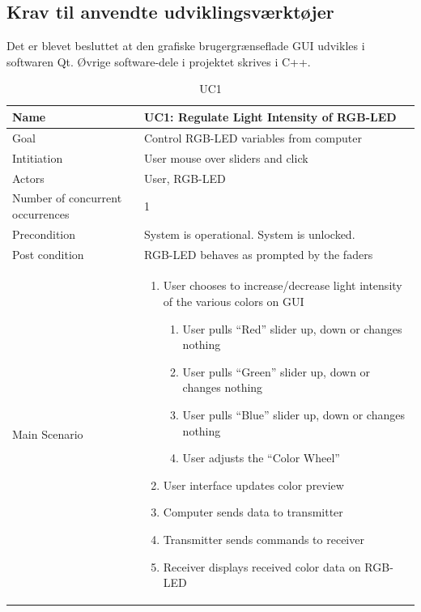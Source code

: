 \documentclass[oneside]{memoir}
\begin{document}
\subsection{Krav til anvendte udviklingsværktøjer}
Det er blevet besluttet at den grafiske brugergrænseflade GUI udvikles i softwaren Qt. Øvrige software-dele
i projektet skrives i C++.








\begin{table}[]
\centering
\caption{UC1}
\label{my-label}
\begin{tabularx}{1.1\textwidth}{|X|X|} 
\hline
Name                             & UC1: Regulate Light Intensity of RGB-LED   \\ \hline
Goal                             & Control RGB-LED variables from computer    \\ \hline
Intitiation                      & User mouse over sliders and click          \\ \hline
Actors                           & User, RGB-LED                              \\ \hline
Number of concurrent occurrences & 1                                          \\ \hline
Precondition                     & System is operational. System is unlocked. \\ \hline
Post condition                   & RGB-LED behaves as prompted by the faders  \\ \hline
Main Scenario                    &   
                                  \begin{enumerate} 
                                 \item User chooses to increase/decrease light intensity of the various colors on GUI 
                              \begin{enumerate}[label*=\arabic*.]
                                \item User pulls “Red” slider up, down or changes nothing
                                \item User pulls “Green” slider up, down or changes nothing
                                \item User pulls “Blue” slider up, down or changes nothing
                                \item User adjusts the “Color Wheel”
                                        \end{enumerate}
                                \item User interface updates color preview
                                \item Computer sends data to transmitter
                                \item Transmitter sends commands to receiver
                                \item Receiver displays received color data on RGB-LED
                                 \end{enumerate} 
                                 
                                 \\     \hline
\end{tabularx}
\end{table}
\end{document}
